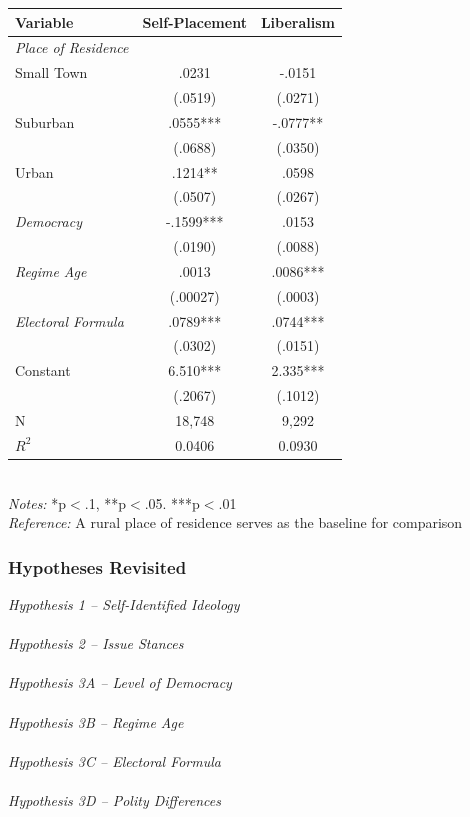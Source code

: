 \documentclass[20pt]{beamer}
\newcommand\e{\emph}
\newcommand\tb{\textbf}
\begin{document}
\begin{frame}
\tiny
\begin{table}[h!]
	\begin{tabulary}{\linewidth}{l c c}
		\\
		\hline
		\tb{Variable}&\tb{Self-Placement}&\tb{Liberalism} \\
		\hline
		\e{Place of Residence} & & \\
		Small Town &.0231&-.0151 \\
		&(.0519)&(.0271) \\
		Suburban& .0555***& -.0777** \\
		&(.0688)& (.0350) \\
		Urban&.1214** & .0598 \\
		&(.0507) & (.0267) \\
		\e{Democracy}& -.1599*** & .0153\\
		&(.0190) & (.0088)\\
		\e{Regime Age} & .0013 & .0086***\\
		&(.00027) & (.0003)\\
		\e{Electoral Formula}&.0789*** & .0744***\\
		&(.0302) & (.0151) \\
		\hline
		Constant& 6.510*** & 2.335*** \\
		&(.2067) & (.1012)\\
		N&18,748 & 9,292 \\
		$R^2$&0.0406& 0.0930 \\
		\hline
	\end{tabulary}
	\\
	\e{Notes:} *p$<$.1, **p$<$.05. ***p$<$.01 \\
	\e{Reference:} A rural place of residence serves as the baseline for comparison
\end{table}
\end{frame}

\begin{frame}
\footnotesize
\frametitle{Hypotheses Revisited}

\e {Hypothesis 1 -- Self-Identified Ideology} \\
~~\\
\e{Hypothesis 2 -- Issue Stances} \\
~~\\
\e{Hypothesis 3A -- Level of Democracy} \\
~~\\
\e{Hypothesis 3B -- Regime Age} \\
~~\\
\e{Hypothesis 3C -- Electoral Formula}\\
~~\\
\e{Hypothesis 3D -- Polity Differences} 

\end{frame}
\end{document}
